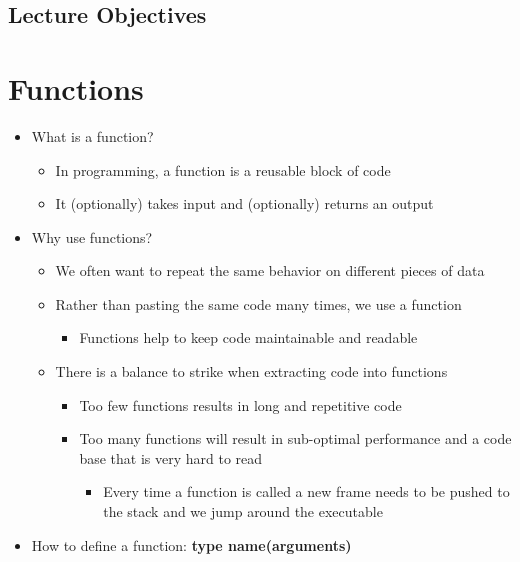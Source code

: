 \documentclass{article}
\title{}
\author{Ryan Baker}
\date{\today}
\begin{document}
\maketitle
\tableofcontents
\pagebreak

\subsection*{Lecture Objectives}

\section{Functions}

\begin{itemize}
	\item What is a function?
	\begin{itemize}
		\item In programming, a function is a reusable block of code
		\item It (optionally) takes input and (optionally) returns an output
	\end{itemize}
	\item Why use functions?
	\begin{itemize}
		\item We often want to repeat the same behavior on different pieces of data
		\item Rather than pasting the same code many times, we use a function
		\begin{itemize}
			\item Functions help to keep code maintainable and readable
		\end{itemize}
		\item There is a balance to strike when extracting code into functions
		\begin{itemize}
			\item Too few functions results in long and repetitive code
			\item Too many functions will result in sub-optimal performance and a code base that is very hard to read \begin{itemize}
				\item Every time a function is called a new frame needs to be pushed to the stack and we jump around the executable
			\end{itemize}
		\end{itemize}
	\end{itemize}
	\item How to define a function: \textbf{type name(arguments)}

\end{itemize}
\end{document}
